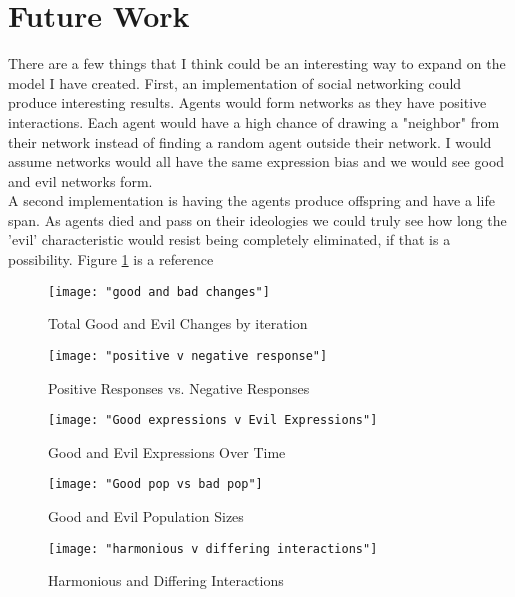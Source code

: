 \documentclass[]{article}
\begin{document}
\section{Future Work}
There are a few things that I think could be an interesting way to expand on the model I have created. First, an implementation of social networking could produce interesting results. Agents would form networks as they have positive interactions. Each agent would have a high chance of drawing a "neighbor" from their network instead of finding a random agent outside their network. I would assume networks would all have the same expression bias and we would see good and evil networks form. \\
A second implementation is having the agents produce offspring and have a life span. As agents died and pass on their ideologies we could truly see how long the 'evil' characteristic would resist being completely eliminated, if that is a possibility.
Figure \ref{fig:good and bad changes} is a reference

\newpage

\begin{figure}
	\centering
	\texttt{[image: "good and bad changes"]}
	\caption{Total Good and Evil Changes by iteration}
	\label{fig:good and bad changes}
\end{figure}

\begin{figure}
	\centering
	\texttt{[image: "positive v negative response"]}
	\caption{Positive Responses vs. Negative Responses}
	\label{fig:positivevnegativeresponse}
\end{figure}

\begin{figure}
	\centering
	\texttt{[image: "Good expressions v Evil Expressions"]}
	\caption{Good and Evil Expressions Over Time}
	\label{fig:good v evil expressions}
\end{figure}

\begin{figure}
	\centering
	\texttt{[image: "Good pop vs bad pop"]}
	\caption{Good and Evil Population Sizes}
	\label{fig:good v evil pop sizes}
\end{figure}

\begin{figure}
	\centering
	\texttt{[image: "harmonious v differing interactions"]}
	\caption{Harmonious and Differing Interactions}
	\label{fig:harmonious v differing}
\end{figure} 
\end{document}
